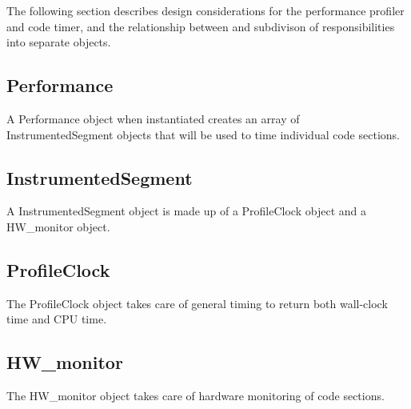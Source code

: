 

The following section describes design considerations for
the performance profiler and code timer, and the relationship 
between and subdivison of responsibilities into separate objects.

\subsection{Performance}

A Performance object when instantiated creates an array of
InstrumentedSegment objects that will be used to time individual
code sections.

\subsection{InstrumentedSegment}

A InstrumentedSegment object is made up of a ProfileClock object
and a HW\_monitor object.

\subsection{ProfileClock}

The ProfileClock object takes care of general timing to return
both wall-clock time and CPU time.

\subsection{HW\_monitor}

The HW\_monitor object takes care of hardware monitoring of code
sections.
